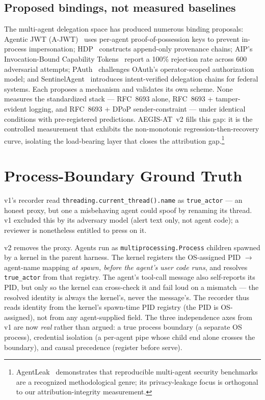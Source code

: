 \documentclass[11pt]{article}
\newcommand{\code}[1]{\texttt{#1}}
\begin{document}
\subsection{Proposed bindings, not measured baselines}
The multi-agent delegation space has produced numerous binding proposals:
Agentic JWT (A-JWT)~\cite{agenticjwt} uses per-agent proof-of-possession keys
to prevent in-process impersonation; HDP~\cite{hdp} constructs append-only
provenance chains; AIP's Invocation-Bound Capability Tokens~\cite{aip} report a
100\% rejection rate across 600 adversarial attempts; PAuth~\cite{pauth}
challenges OAuth's operator-scoped authorization model; and
SentinelAgent~\cite{sentinelagent} introduces intent-verified delegation chains
for federal systems. Each proposes a mechanism and validates its own scheme.
None measures the standardized stack --- RFC~8693 alone, RFC~8693 +
tamper-evident logging, and RFC~8693 + DPoP sender-constraint --- under
identical conditions with pre-registered predictions. AEGIS-AT~v2 fills this
gap: it is the controlled measurement that exhibits the non-monotonic
regression-then-recovery curve, isolating the load-bearing layer that closes
the attribution gap.\footnote{AgentLeak~\cite{agentleak} demonstrates that
reproducible multi-agent security benchmarks are a recognized methodological
genre; its privacy-leakage focus is orthogonal to our attribution-integrity
measurement.}

\section{Process-Boundary Ground Truth}
\label{sec:recorder}

v1's recorder read \code{threading.current\_thread().name} as
\code{true\_actor} --- an honest proxy, but one a misbehaving agent could
spoof by renaming its thread. v1 excluded this by its adversary model (alert
text only, not agent code); a reviewer is nonetheless entitled to press on
it.

v2 removes the proxy. Agents run as \code{multiprocessing.Process} children
spawned by a kernel in the parent harness. The kernel registers the OS-assigned
PID $\to$ agent-name mapping \emph{at spawn, before the agent's user code
runs}, and resolves \code{true\_actor} from that registry. The agent's
tool-call message also self-reports its PID, but only so the kernel can
cross-check it and fail loud on a mismatch --- the resolved identity is always
the kernel's, never the message's. The recorder thus reads identity from the
kernel's spawn-time PID registry (the PID is OS-assigned), not from any
agent-supplied field. The
three independence axes from v1 are now \emph{real} rather than argued: a true
process boundary (a separate OS process), credential isolation (a per-agent
pipe whose child end alone crosses the boundary), and causal precedence
(register before serve).
\end{document}
